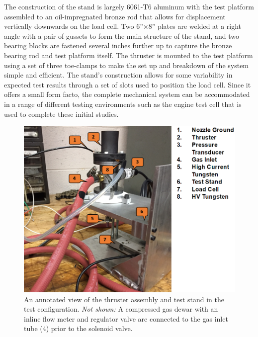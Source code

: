 \documentclass[conference]{IEEEtran}
\begin{document}
The construction of the stand is largely 6061-T6 aluminum with the test platform assembled to an oil-impregnated bronze rod that allows for displacement vertically downwards on the load cell.
Two 6''$\times$8'' plates are welded at a right angle with a pair of gussets to form the main structure of the stand, and two bearing blocks are fastened several inches further up to capture the bronze bearing rod and test platform itself.
The thruster is mounted to the test platform using a set of three toe-clamps to make the set up and breakdown of the system simple and efficient.
The stand's construction allows for some variability in expected test results through a set of slots used to position the load cell. Since it offers a small form facto, the complete mechanical system can be accommodated in a range of different testing environments such as the engine test cell that is used to complete these initial studies.

\begin{figure}[htp]
  \includegraphics[width=\linewidth]{figs/teststand-annotated.PNG}
  \caption{An annotated view of the thruster assembly and test stand in the test configuration.
  \emph{Not shown:} A compressed gas dewar with an inline flow meter and regulator valve are connected to the gas inlet tube (4) prior to the solenoid valve.
\label{fig:teststand-annotated}
}
\end{figure}
\end{document}
